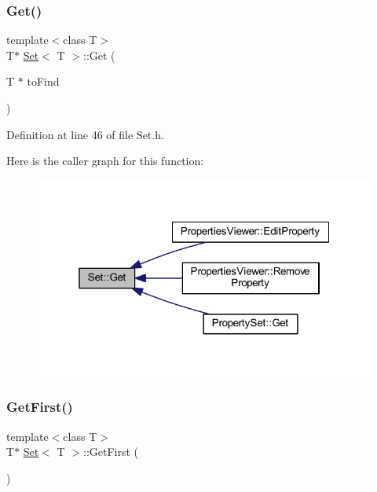 \subsubsection{\texorpdfstring{Get()}{Get()}}
{\footnotesize\ttfamily template$<$class T$>$ \\
T$\ast$ \hyperlink{class_set}{Set}$<$ T $>$\+::Get (\begin{DoxyParamCaption}\item[{T $\ast$}]{to\+Find }\end{DoxyParamCaption})\hspace{0.3cm}{\ttfamily [inline]}}



Definition at line 46 of file Set.\+h.

Here is the caller graph for this function\+:
\nopagebreak
\begin{figure}[H]
\begin{center}
\leavevmode
\includegraphics[width=319pt]{class_set_a6afa992f88acf67a53ae98e7856a9266_icgraph}
\end{center}
\end{figure}
\mbox{\label{class_set_ad9d6a75a557bc4db0578f18675f7517b}} 
\subsubsection{\texorpdfstring{Get\+First()}{GetFirst()}}
{\footnotesize\ttfamily template$<$class T$>$ \\
T$\ast$ \hyperlink{class_set}{Set}$<$ T $>$\+::Get\+First (\begin{DoxyParamCaption}{ }\end{DoxyParamCaption})\hspace{0.3cm}{\ttfamily [inline]}}



